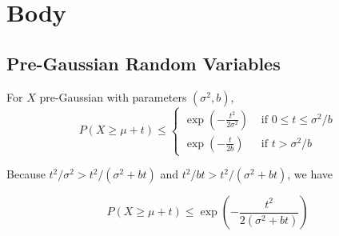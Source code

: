 

\section{Body}

\subsection{Pre-Gaussian Random Variables}
\begin{theorem} \cite*{Bartlett:2020}
  For $X$ pre-Gaussian with parameters $(\sigma^2, b)$,
  \begin{equation}
    P(X \geq \mu+t) \leq\left\{\begin{array}{ll}
    \exp \left(-\frac{t^{2}}{2 \sigma^{2}}\right) & \text { if } 0 \leq t \leq \sigma^{2} / b \\
    \exp \left(-\frac{t}{2 b}\right) & \text { if } t>\sigma^{2} / b
    \end{array}\right.
  \end{equation}
\end{theorem}

Because $t^2/ \sigma^2 > t^2/ (\sigma^2 + bt)$ and $t^2/ bt > t^2/ (\sigma^2 + bt)$, we have

\begin{equation}
  P(X \geq \mu+t) \leq 
  \exp \left(-\frac{t^{2}}{2 (\sigma^2 + bt)}\right) 
\end{equation}

